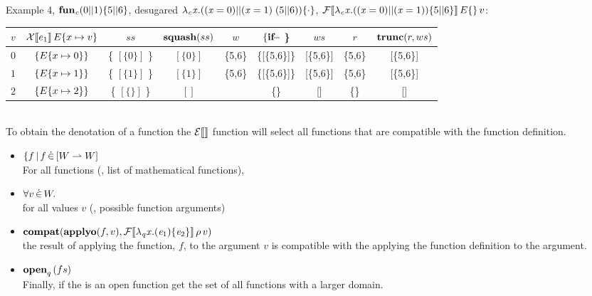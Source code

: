 Example 4, \ensuremath{\textbf{fun}_{\Varid{c}}(\mathrm{0}||\mathrm{1})\{\mathrm{5}||\mathrm{6}\}}, desugared \ensuremath{\lambda_{\Varid{c}}\Varid{x}.((\Varid{x}\mathrel{=}\mathrm{0})||(\Varid{x}\mathrel{=}\mathrm{1})\;(\mathrm{5}||\mathrm{6}))\{\cdot \}}, $\mathcal{F}\llbracket \lambda_{\mathit{c}}\mathit{x}.((\mathit{x}\mathrel{=}\mathrm{0})||(\mathit{x}\mathrel{=}\mathrm{1}))\{\mathrm{5}||\mathrm{6}\} \rrbracket\, E\{  \} \, v$:

\begin{tabular}{|c|c|c|c|c|c|c|c|c|}
  \hline
  $v$ & $\mathcal{X}\llbracket e_1 \rrbracket\, E\{  x \mapsto v \} $ & \mbox{ $ss$ } & $\textbf{squash}(ss)$ & $w$ & $ \{ \ensuremath{\textbf{if}} \mydots$ \} & $ws$ & $r$ & $\textbf{trunc}(r,ws)$\\
  \hline
  $0$ & $\{ E\{  x \mapsto 0  \} \}$ & \{ $[\{0\}]$ \} & $[\{0\}]$ & \{5,6\} & \{[\{5,6\}]\} & [\{5,6\}] & \{5,6\} & [\{5,6\}] \\
  \hline
  $1$ & $\{ E\{  x \mapsto 1  \} \}$ & \{ $[\{1\}]$ \} & $[\{1\}]$ & \{5,6\} & \{[\{5,6\}]\} & [\{5,6\}] & \{5,6\} & [\{5,6\}] \\
  \hline
  $2$ & $\{ E\{  x \mapsto 2  \} \}$ & \{ $[\{\}]$ \} & $[]$ & & \{\} & [] & \{\} & [] \\
  \hline
\end{tabular} \\[4mm]

To obtain the denotation of a function the $\mathcal{E}\llbracket  \rrbracket$ function will select all functions
that are compatible with the function definition.
\begin{itemize}
\item $\{ f \,|\, f \,\dot{\in}\, [W \rightharpoonup W]$ \\
  For all functions (\ie, list of mathematical functions),
\item $\forall v \,\dot{\in}\, W .$ \\
  for all values $v$ (\ie, possible function arguments)
\item $\textbf{compat}(\textbf{applyo}(f,v), \mathcal{F}\llbracket \lambda_{\mathit{q}}\mathit{x}.(\mathit{e}_{\mathrm{1}})\{\mathit{e}_{\mathrm{2}}\} \rrbracket\, \rho \, v)$ \\
  the result of applying the function, $f$, to the argument $v$ is compatible
  with the applying the function definition to the argument.
\item $\textbf{open}_{q}\,(fs)$ \\
  Finally, if the is an open function get the set of all functions with a larger domain.
\end{itemize}

